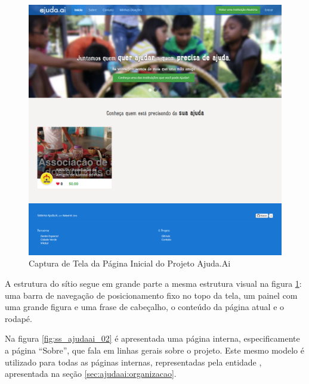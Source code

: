 \begin{figure}[H]
	\caption{\label{fig:ss_ajudaai_01}Captura de Tela da Página Inicial do Projeto Ajuda.Ai}
    \centering
    \includegraphics[scale=0.375]{imagens/screenshot-ajudaai-01.png}
\end{figure}

A estrutura do sítio segue em grande parte a mesma estrutura visual na figura \ref{fig:ss_ajudaai_01}: uma barra de navegação de posicionamento fixo no topo da tela, um painel com uma grande figura e uma frase de cabeçalho, o conteúdo da página atual e o rodapé.

Na figura \ref{fig:ss_ajudaai_02} é apresentada uma página interna, especificamente a página ``Sobre'', que fala em linhas gerais sobre o projeto. Este mesmo modelo é utilizado para todas as páginas internas, representadas pela entidade , apresentada na seção \ref{sec:ajudaai:organizacao}.

